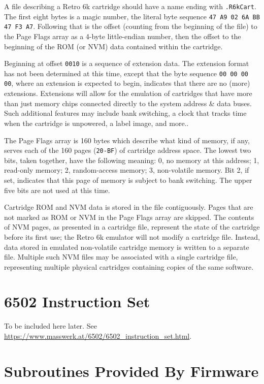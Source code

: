\documentclass[12pt]{{memoir}}
\begin{document}
A file describing a Retro 6k cartridge should have a name ending with \texttt{.R6kCart}. The first eight bytes is a magic number, the literal byte sequence \texttt{47 A9 02 6A BB 47 F3 A7}. Following that is the offset (counting from the beginning of the file) to the Page Flags array as a 4-byte little-endian number, then the offset to the beginning of the ROM (or NVM) data contained within the cartridge.

Beginning at offset \texttt{0010} is a sequence of extension data. The extension format has not been determined at this time, except that the byte sequence \texttt{00 00 00 00}, where an extension is expected to begin, indicates that there are no (more) extensions. Extensions will allow for the emulation of cartridges that have more than just memory chips connected directly to the system address \& data buses. Such additional features may include bank switching, a clock that tracks time when the cartridge is unpowered, a label image, and more..

The Page Flags array is 160 bytes which describe what kind of memory, if any, serves each of the 160 pages (\texttt{20-BF}) of cartridge address space. The lowest two bits, taken together, have the following meaning: 0, no memory at this address; 1, read-only memory; 2, random-access memory; 3, non-volatile memory. Bit 2, if set, indicates that this page of memory is subject to bank switching. The upper five bits are not used at this time.

Cartridge ROM and NVM data is stored in the file contiguously. Pages that are not marked as ROM or NVM in the Page Flags array are skipped. The contents of NVM pages, as presented in a cartridge file, represent the state of the cartridge before its first use; the Retro 6k emulator will not modify a cartridge file. Instead, data stored in emulated non-volatile cartridge memory is written to a separate file. Multiple such NVM files may be associated with a single cartridge file, representing multiple physical cartridges containing copies of the same software.

\section{6502 Instruction Set}

To be included here later. See \url{https://www.masswerk.at/6502/6502_instruction_set.html}.

\section{Subroutines Provided By Firmware}
\end{document}
